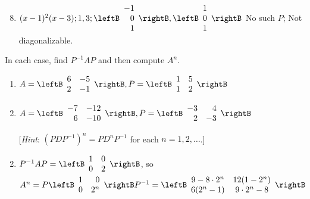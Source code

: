 \begin{multicols}{2}
\begin{ex}
\begin{sol}
\begin{enumerate}[label={\alph*.}]
\setcounter{enumi}{7}
\item $(x-1)^2(x-3) ; 1, 3; \leftB \begin{array}{r}
-1 \\
0 \\
1
\end{array}\rightB, \leftB \begin{array}{r}
1 \\
0 \\
1
\end{array}\rightB$
 No such $P$; Not diagonalizable.
\end{enumerate}
\end{sol}
\end{ex}


\begin{ex}
In each case, find $P^{-1}AP$ and then compute $A^{n}$.


\begin{enumerate}[label={\alph*.}]
\item $ A = \leftB \begin{array}{rr}
6 & -5 \\
2 & -1 
\end{array}\rightB, P = \leftB \begin{array}{rr}
1 & 5 \\
1 & 2 
\end{array}\rightB$


\item $ A = \leftB \begin{array}{rr}
-7 & -12 \\
6 & -10 
\end{array}\rightB, P = \leftB \begin{array}{rr}
-3 & 4 \\
2 & -3 
\end{array}\rightB$

[\textit{Hint}: $(PDP^{-1})^{n} = PD^{n}P^{-1}$ for each $n = 1, 2, \dots$.]

\end{enumerate}
\begin{sol}
\begin{enumerate}[label={\alph*.}]
\setcounter{enumi}{1}
\item  $ P^{-1}AP = \leftB \begin{array}{rr}
1 & 0 \\
0 & 2
\end{array}\rightB$, so $A^n  = P \leftB \begin{array}{rr}
1 & 0 \\
0 & 2^n 
\end{array}\rightB P^{-1} = \leftB \begin{array}{cc}
9 - 8 \cdot 2^n & 12(1-2^n) \\
6(2^n-1) & 9\cdot 2^n - 8
\end{array}\rightB$


\end{enumerate}
\end{sol}
\end{ex}
\end{multicols}
